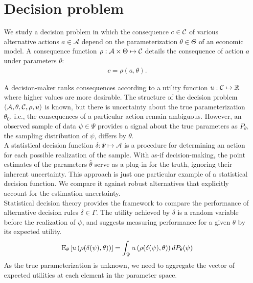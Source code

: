 \section{Decision problem}
We study a decision problem in which the consequence $c \in \mathcal{C}$ of various alternative actions $a\in\mathcal{A}$ depend on the parameterization $\theta\in \Theta$ of an economic model. A consequence function $\rho: \mathcal{A} \times \Theta \mapsto \mathcal{C}$  details the consequence of action $a$ under parameters $\theta$:
%
\begin{align*}
c = \rho(a, \theta).
\end{align*}

A decision-maker ranks consequences according to a utility function $u: \mathcal{C} \mapsto \mathbb{R}$ where higher values are more desirable. The structure of the decision problem $(\mathcal{A}, \theta, \mathcal{C}, \rho, u)$ is known, but there is uncertainty about the true parameterization $\theta_0$, i.e., the consequences of a particular action remain ambiguous. However, an observed sample of data $\psi \in \Psi$ provides a signal about the true parameters as $P_{\theta}$, the sampling distribution of $\psi$, differs by $\theta$.\\

A statistical decision function $\delta: \Psi \mapsto \mathcal{A}$ is a procedure for determining an action for each possible realization of the sample. With as-if decision-making, the point estimates of the parameters $\hat{\theta}$ serve as a plug-in for the truth, ignoring their inherent uncertainty. This approach is just one particular example of a statistical decision function. We compare it against robust alternatives that explicitly account for the estimation uncertainty.\\

Statistical decision theory provides the framework to compare the performance of alternative decision rules  $\delta \in \Gamma$. The utility achieved by $\delta$ is a random variable before the realization of $\psi$, and \citet{Wald.1950} suggests measuring performance for a given $\theta$ by its expected utility.
%
\begin{align*}
  \mathrm{E}_{\theta}\left[u\left(\rho(\delta(\psi), \theta)\right)\right] = \int_\Psi u\left(\rho(\delta(\psi), \theta)\right) d P_{\theta}(\psi)
\end{align*}
%
As the true parameterization is unknown, we need to aggregate the vector of expected utilities at each element in the parameter space.\\

